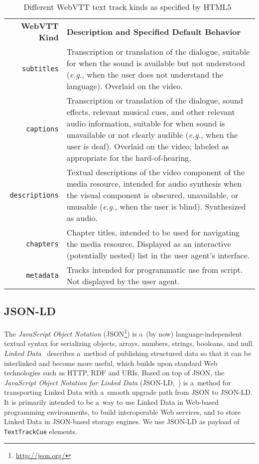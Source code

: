 \documentclass{sig-alternate}
\newcommand{\inlinelistingsize}{\fontsize{8pt}{11pt}}
\let\oldurl\url
\renewcommand{\url}[1]{\inlinelistingsize\oldurl{#1}}
\begin{document}

\begin{table*}[h!]\footnotesize
\begin{tabular}{ r p{15cm} }
\textbf{WebVTT Kind} & \textbf{Description and Specified Default Behavior}\\

\texttt{subtitles} & Transcription or translation of the dialogue,
suitable for when the sound is available but not understood
(\emph{e.g.}, when the user does not understand the language). Overlaid on the video.\\

\texttt{captions} & Transcription or translation of the dialogue,
sound effects, relevant musical cues,
and other relevant audio information,
suitable for when sound is unavailable or not clearly audible
(\emph{e.g.}, when the user is deaf). Overlaid on the video;
labeled as appropriate for the hard-of-hearing.\\

\texttt{descriptions} & Textual descriptions of the video component
of the media resource, intended for audio synthesis
when the visual component is obscured, unavailable, or unusable
(\emph{e.g.}, when the user is blind).
Synthesized as audio.\\

\texttt{chapters} & Chapter titles, intended to be used for navigating
the media resource. Displayed as an interactive (potentially nested)
list in the user agent's interface.\\

\texttt{metadata} & Tracks intended for programmatic use from script.
Not displayed by the user agent.\\
\end{tabular}
  \caption{Different WebVTT text track kinds as specified by
    HTML5~\cite{berjon2013html5}}
  \label{table:texttrackkinds}
\end{table*}

\subsection{JSON-LD}

The \emph{JavaScript Object Notation}
(JSON\footnote{\url{http://json.org/}})
is a~(by now) language-independent textual syntax
for serializing objects, arrays, numbers, strings, booleans, and null.
\emph{Linked Data}~\cite{bizer2009linkeddata}
describes a~method of publishing structured data
so that it can be interlinked and become more useful,
which builds upon standard Web technologies such as HTTP, RDF and URIs.
Based on top of JSON, the
\emph{JavaScript Object Notation for Linked Data}
(JSON-LD,~\cite{sporny2013jsonld}) is a~method for transporting
Linked Data with a~smooth upgrade path from JSON to JSON-LD.
It is primarily intended to be a~way to use
Linked Data in Web-based programming environments,
to build interoperable Web services,
and to store Linked Data in JSON-based storage engines.
We use JSON-LD as payload of \texttt{TextTrackCue} elements.
\end{document}

